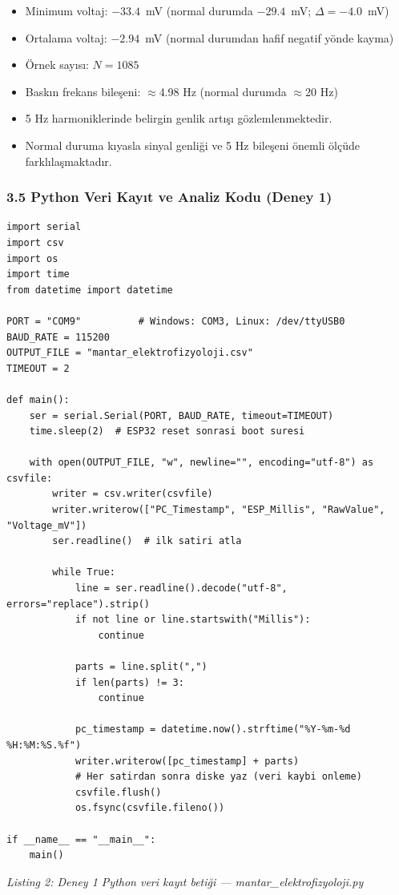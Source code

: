 \documentclass[11pt,a4paper]{article}
\begin{document}
\begin{itemize}[leftmargin=1cm]
  \item Minimum voltaj: $-33.4$~mV (normal durumda $-29.4$~mV; $\Delta = -4.0$~mV)
  \item Ortalama voltaj: $-2.94$~mV (normal durumdan hafif negatif yönde kayma)
  \item Örnek sayısı: $N = 1085$
  \item Baskın frekans bileşeni: $\approx$4.98 Hz (normal durumda $\approx$20 Hz)
  \item 5 Hz harmoniklerinde belirgin genlik artışı gözlemlenmektedir.
  \item Normal duruma kıyasla sinyal genliği ve 5 Hz bileşeni önemli ölçüde farklılaşmaktadır.
\end{itemize}

\subsubsection*{3.5 Python Veri Kayıt ve Analiz Kodu (Deney 1)}

\begin{verbatim}
import serial
import csv
import os
import time
from datetime import datetime

PORT = "COM9"          # Windows: COM3, Linux: /dev/ttyUSB0
BAUD_RATE = 115200
OUTPUT_FILE = "mantar_elektrofizyoloji.csv"
TIMEOUT = 2

def main():
    ser = serial.Serial(PORT, BAUD_RATE, timeout=TIMEOUT)
    time.sleep(2)  # ESP32 reset sonrasi boot suresi

    with open(OUTPUT_FILE, "w", newline="", encoding="utf-8") as csvfile:
        writer = csv.writer(csvfile)
        writer.writerow(["PC_Timestamp", "ESP_Millis", "RawValue", "Voltage_mV"])
        ser.readline()  # ilk satiri atla

        while True:
            line = ser.readline().decode("utf-8", errors="replace").strip()
            if not line or line.startswith("Millis"):
                continue

            parts = line.split(",")
            if len(parts) != 3:
                continue

            pc_timestamp = datetime.now().strftime("%Y-%m-%d %H:%M:%S.%f")
            writer.writerow([pc_timestamp] + parts)
            # Her satirdan sonra diske yaz (veri kaybi onleme)
            csvfile.flush()
            os.fsync(csvfile.fileno())

if __name__ == "__main__":
    main()
\end{verbatim}
\textit{Listing 2: Deney 1 Python veri kayıt betiği --- mantar\_elektrofizyoloji.py}
\end{document}
